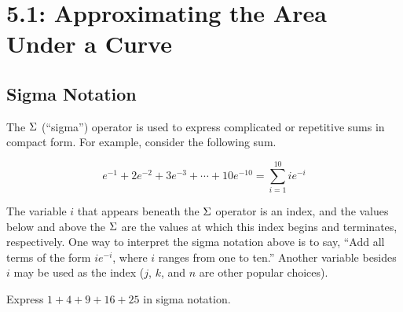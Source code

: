\documentclass[12pt]{article}
\begin{document}
\section*{5.1: Approximating the Area Under a Curve}


\vspace{5mm}

\subsection*{Sigma Notation}

The $\displaystyle\Sigma$ (``sigma'') operator is used to express complicated or repetitive sums in compact form. For example, consider the following sum.

$$e^{-1}+2e^{-2}+3e^{-3}+\cdots +10e^{-10}=\sum_{i=1}^{10} ie^{-i}$$

\vspace{3mm}

The variable $i$ that appears beneath the $\displaystyle\Sigma$ operator is an index, and the values below and above the $\displaystyle\Sigma$ are the values at which this index begins and terminates, respectively. One way to interpret the sigma notation above is to say, ``Add all terms of the form $ie^{-i}$, where $i$ ranges from one to ten.'' Another variable besides $i$ may be used as the index ($j$, $k$, and $n$ are other popular choices).

\Example Express $1+4+9+16+25$ in sigma notation.
\end{document}
